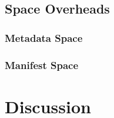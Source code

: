 \subsection{Space Overheads}

\subsubsection{Metadata Space}

\subsubsection{Manifest Space}

\section{Discussion}

